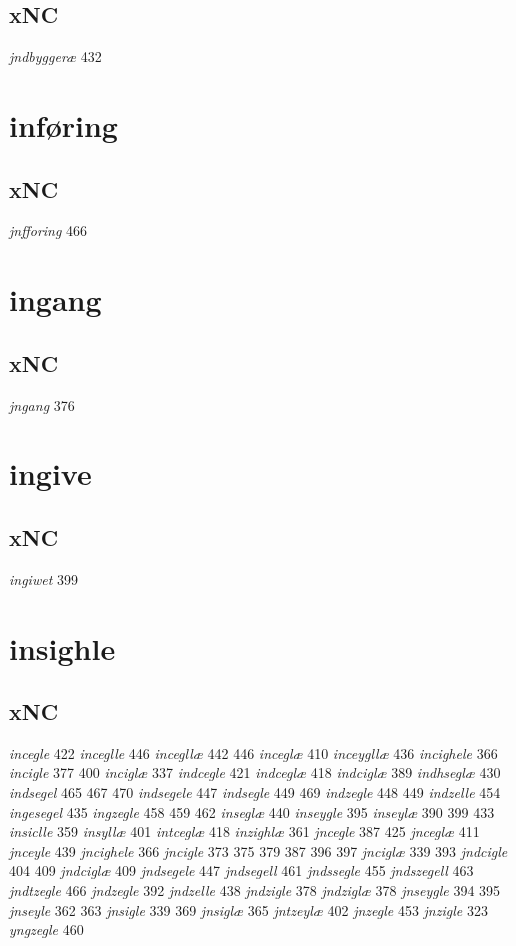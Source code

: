 \documentclass[a4paper,twocolumn]{article}
\begin{document}
\subsection{xNC}
\label{sec:orgec05497}
\emph{jndbyggeræ} 432 
\section{inføring}
\label{sec:org76c2aba}
\subsection{xNC}
\label{sec:org723db06}
\emph{jnfforing} 466 
\section{ingang}
\label{sec:org13af823}
\subsection{xNC}
\label{sec:org27e1083}
\emph{jngang} 376 
\section{ingive}
\label{sec:org764bc1b}
\subsection{xNC}
\label{sec:org9493f82}
\emph{ingiwet} 399 
\section{insighle}
\label{sec:orgcd1d4ed}
\subsection{xNC}
\label{sec:org08c7eba}
\emph{incegle} 422 \emph{inceglle} 446 \emph{incegllæ} 442 446 \emph{inceglæ} 410 \emph{inceygllæ} 436 \emph{incighele} 366 \emph{incigle} 377 400 \emph{inciglæ} 337 \emph{indcegle} 421 \emph{indceglæ} 418 \emph{indciglæ} 389 \emph{indhseglæ} 430 \emph{indsegel} 465 467 470 \emph{indsegele} 447 \emph{indsegle} 449 469 \emph{indzegle} 448 449 \emph{indzelle} 454 \emph{ingesegel} 435 \emph{ingzegle} 458 459 462 \emph{inseglæ} 440 \emph{inseygle} 395 \emph{inseylæ} 390 399 433 \emph{insiclle} 359 \emph{insyllæ} 401 \emph{intceglæ} 418 \emph{inzighlæ} 361 \emph{jncegle} 387 425 \emph{jnceglæ} 411 \emph{jnceyle} 439 \emph{jncighele} 366 \emph{jncigle} 373 375 379 387 396 397 \emph{jnciglæ} 339 393 \emph{jndcigle} 404 409 \emph{jndciglæ} 409 \emph{jndsegele} 447 \emph{jndsegell} 461 \emph{jndssegle} 455 \emph{jndszegell} 463 \emph{jndtzegle} 466 \emph{jndzegle} 392 \emph{jndzelle} 438 \emph{jndzigle} 378 \emph{jndziglæ} 378 \emph{jnseygle} 394 395 \emph{jnseyle} 362 363 \emph{jnsigle} 339 369 \emph{jnsiglæ} 365 \emph{jntzeylæ} 402 \emph{jnzegle} 453 \emph{jnzigle} 323 \emph{yngzegle} 460 
\end{document}
